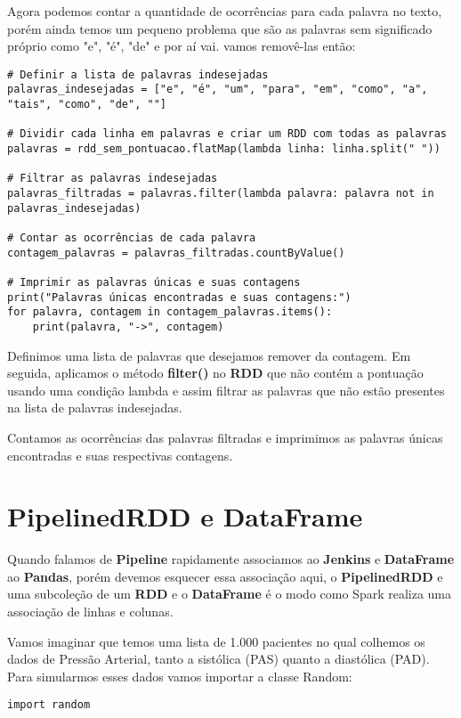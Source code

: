 Agora podemos contar a quantidade de ocorrências para cada palavra no texto, porém ainda temos um pequeno problema que são as palavras sem significado próprio como "e", "é", "de" e por aí vai. vamos removê-las então:
\begin{lstlisting}[]
# Definir a lista de palavras indesejadas
palavras_indesejadas = ["e", "é", "um", "para", "em", "como", "a", "tais", "como", "de", ""]

# Dividir cada linha em palavras e criar um RDD com todas as palavras
palavras = rdd_sem_pontuacao.flatMap(lambda linha: linha.split(" "))

# Filtrar as palavras indesejadas
palavras_filtradas = palavras.filter(lambda palavra: palavra not in palavras_indesejadas)

# Contar as ocorrências de cada palavra
contagem_palavras = palavras_filtradas.countByValue()

# Imprimir as palavras únicas e suas contagens
print("Palavras únicas encontradas e suas contagens:")
for palavra, contagem in contagem_palavras.items():
    print(palavra, "->", contagem)
\end{lstlisting}

Definimos uma lista de palavras que desejamos remover da contagem. Em seguida, aplicamos o método \textbf{filter()} no \textbf{RDD} que não contém a pontuação usando uma condição lambda e assim filtrar as palavras que não estão presentes na lista de palavras indesejadas.

Contamos as ocorrências das palavras filtradas e imprimimos as palavras únicas encontradas e suas respectivas contagens.

\section{PipelinedRDD e DataFrame}
Quando falamos de \textbf{Pipeline} rapidamente associamos ao \textbf{Jenkins} e \textbf{DataFrame} ao \textbf{Pandas}, porém devemos esquecer essa associação aqui, o \textbf{PipelinedRDD} e uma subcoleção de um \textbf{RDD} e o \textbf{DataFrame} é o modo como Spark realiza uma associação de linhas e colunas.

Vamos imaginar que temos uma lista de 1.000 pacientes no qual colhemos os dados de Pressão Arterial, tanto a sistólica (PAS) quanto a diastólica (PAD). Para simularmos esses dados vamos importar a classe Random:
\begin{lstlisting}[]
import random
\end{lstlisting}


